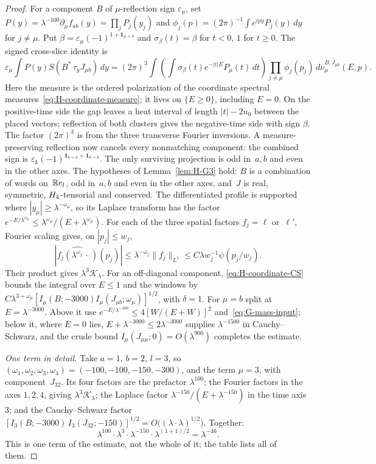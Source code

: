 \begin{proof}
For a component $B$ of $\mu$-reflection sign $\varepsilon_\mu$, set $P(y)=\lambda^{-100}\partial_\mu f_{ab}(y)=\prod_jP_j(y_j)$ and $\phi_j(p)=(2\pi)^{-1}\int e^{ipy}P_j(y)\,dy$ for $j\ne\mu$. Put $\beta=\varepsilon_\mu(-1)^{1+\mathbf1_{\mu=b}}$ and $\sigma_\beta(t)=\beta$ for $t<0$, $1$ for $t\ge0$. The signed cross-slice identity is
\[
 \varepsilon_\mu\int P(y)S(B^*\,\tau_yJ_{\mu b})\,dy
 =(2\pi)^3\int\!\left(\int\sigma_\beta(t)e^{-|t|E}P_\mu(t)\,dt\right)
   \prod_{j\ne\mu}\phi_j(p_j)\,d\nu_\mu^{B,J_{\mu b}}(E,p).
\]
Here the measure is the ordered polarization of the coordinate spectral measures~\eqref{eq:H-coordinate-measure}; it lives on $\{E\ge0\}$, including $E=0$. On the positive-time side the gap leaves a heat interval of length $|t|-2u_0$ between the placed vectors; reflection of both clusters gives the negative-time side with sign $\beta$. The factor $(2\pi)^3$ is from the three transverse Fourier inversions. A measure-preserving reflection now cancels every nonmatching component: the combined sign is $\varepsilon_k(-1)^{\mathbf1_{k=a}+\mathbf1_{k=b}}$. The only surviving projection is odd in~$a,b$ and even in the other axes. The hypotheses of Lemma~\ref{lem:H-G3} hold: $B$ is a combination of words on~$\mathbb{R} e_l$, odd in~$a,b$ and even in the other axes, and~$J$ is real, symmetric, $H_4$-tensorial and conserved. The differentiated profile is supported where $|y_\mu|\ge\lambda^{-\omega_\mu}$, so its Laplace transform has the factor $e^{-E/\lambda^{\omega_\mu}}\le\lambda^{\omega_\mu}/(E+\lambda^{\omega_\mu})$. For each of the three spatial factors $f_j=\ell$ or~$\ell'$, Fourier scaling gives, on $|p_j|\le w_j$,
\begin{equation*}
|\widehat{f_j(\lambda^{\omega_j}\,\cdot\,)}(p_j)|
\le\lambda^{-\omega_j}\|f_j\|_{L^1}
\le C\lambda w_j^{-1}\psi(p_j/w_j).
\end{equation*}
Their product gives $\lambda^3\mathcal K_\lambda$. For an off-diagonal component, \eqref{eq:H-coordinate-CS} bounds the integral over $E\le1$ and the windows by $C\lambda^{3+\omega_\mu}[I_\mu(B;-3000)I_\mu(J_{\mu b};\omega_\mu)]^{1/2}$, with $\delta=1$. For $\mu=b$ split at $E=\lambda^{-3000}$. Above it use $e^{-E/\lambda^{-100}}\le4[W/(E+W)]^2$ and~\eqref{eq:G-mass-input}; below it, where $E=0$ lies, $E+\lambda^{-3000}\le2\lambda^{-3000}$ supplies $\lambda^{-1500}$ in Cauchy--Schwarz, and the crude bound $I_\mu(J_{\mu\mu};0)=O(\lambda^{900})$ completes the estimate.

\emph{One term in detail.} Take $a=1$, $b=2$, $l=3$, so $(\omega_1,\omega_2,\omega_3,\omega_4)=(-100,-100,-150,-300)$, and the term $\mu=3$, with component~$J_{32}$. Its four factors are the prefactor $\lambda^{100}$; the Fourier factors in the axes $1,2,4$, giving $\lambda^3\mathcal K_\lambda$; the Laplace factor $\lambda^{-150}/(E+\lambda^{-150})$ in the time axis~$3$; and the Cauchy--Schwarz factor $[I_3(B;-3000)\,I_3(J_{32};-150)]^{1/2}=O\bigl((\lambda\cdot\lambda)^{1/2}\bigr)$. Together:
\begin{equation*}
\lambda^{100}\cdot\lambda^{3}\cdot\lambda^{-150}\cdot\lambda^{(1+1)/2}=\lambda^{-46}.
\end{equation*}
This is one term of the estimate, not the whole of it; the table lists all of them.


\end{proof}
